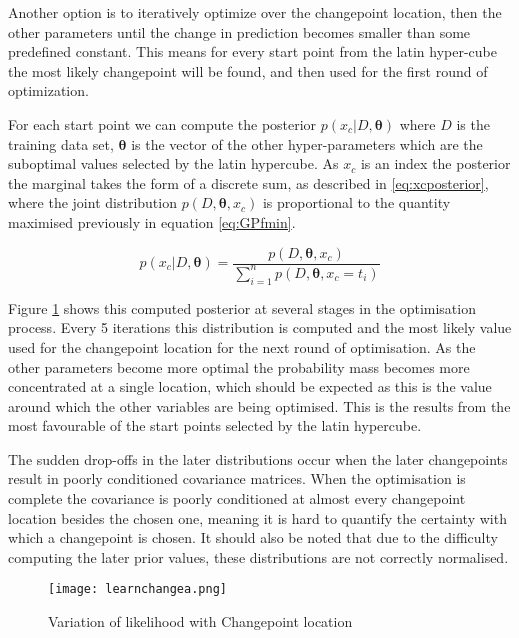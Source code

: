 \documentclass[a4paper,11pt]{report}
\begin{document}
Another option is to iteratively optimize over the changepoint location, then the other parameters until the change in prediction becomes smaller than some predefined constant. This means for every start point from the latin hyper-cube the most likely changepoint will be found, and then used for the first round of optimization. 

For each start point we can compute the posterior \(p(x_c | D, \boldsymbol{\theta})\) where \(D\) is the training data set, \(\boldsymbol{\theta}\) is the vector of the other hyper-parameters which are the suboptimal values selected by the latin hypercube. As \(x_c\) is an index the posterior the marginal takes the form of a discrete sum, as described in \ref{eq:xcposterior}, where the joint distribution \(p(D,\boldsymbol{\theta},x_c)\) is proportional to the quantity maximised previously in equation \ref{eq:GPfmin}.

\begin{equation} \label{eq:xcposterior}
p(x_c | D, \boldsymbol{\theta}) = \frac{p(D,\boldsymbol{\theta},x_c)} {\displaystyle \sum_{i=1}^{n} p(D,\boldsymbol{\theta},x_c = t_i)}
\end{equation}

Figure \ref{fig:oscpvariation} shows this computed posterior at several stages in the optimisation process. Every 5 iterations this distribution is computed and the most likely value used for the changepoint location for the next round of optimisation. As the other parameters become more optimal the probability mass becomes more concentrated at a single location, which should be expected as this is the value around which the other variables are being optimised. This is the results from the most favourable of the start points selected by the latin hypercube.

The sudden drop-offs in the later distributions occur when the later changepoints result in poorly conditioned covariance matrices. When the optimisation is complete the covariance is poorly conditioned at almost every changepoint location besides the chosen one, meaning it is hard to quantify the certainty with which a changepoint is chosen. It should also be noted that due to the difficulty computing the later prior values, these distributions are not correctly normalised.

\begin{figure}
\centering
\texttt{[image: learnchangea.png]}
\caption{Variation of likelihood with Changepoint location}
\label{fig:oscpvariation}
\end{figure}
\end{document}
